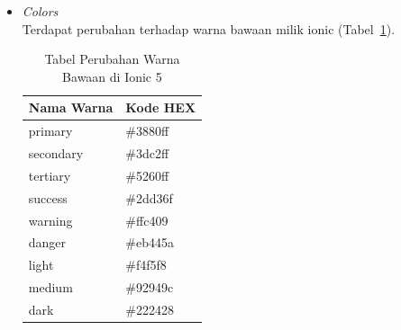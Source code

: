 \begin{enumerate}
\begin{itemize}
\begin{itemize}
			Properti {\it selected} telah dihapus. Sebagai gantinya harus mengatur properti nilai pada ion-select induk agar sesuai dengan opsi terpilih yang diinginkan (Kode~\ref{lst:selectOption}).
			\begin{lstlisting}[language=php, label={lst:selectOption}, caption=Kode Program untuk Select Option]
				<ion-select value="two">
					<ion-select-option value="one">One</ion-select-option>
					<ion-select-option value="two">Two</ion-select-option>
				</ion-select>
			\end{lstlisting}
			\item {\it Toast} \\
			Properti {\it close button} seperti showCloseButton dan closeButtonText telah dihapus. Sebagai gantinya, gunakan {\it buttons array} untuk fungsi batal (Kode~\ref{lst:toast}.
			\begin{lstlisting}[language=php, label={lst:toast}, caption=Kode Program untuk Toast]
				async presentToast() {
					const toast = await this.toastController.create({
						message: 'Your settings have been saved.',
						buttons: [
						{
							text: 'Close',
							role: 'cancel',
							handler: () => {
							console.log('Close clicked');
						}
						}
						]
					});
					toast.present();
				}
			\end{lstlisting}
		\end{itemize}
		Selain yang sudah disebutkan, terdapat beberapa komponen lain yang mendapat perubahan di Ionic 5, namun tidak ditulis di dalam dokumen skripsi ini. Komponen tersebut antara lain Action Sheet, Anchor, Card, FAB, Item, Menu Button, Nav Link, Radio, Segment, Segment Button, Skeleton Text, Split Pane, dan Tabs~\footnote{\textit{`Breaking Changes'} https://github.com/ionic-team/ionic-framework/blob/main/BREAKING.md, Diakses pada 20 November 2021. \label{ref:breakingChangesIonic5}}.

		\item {\it Colors} \\
		Terdapat perubahan terhadap warna bawaan milik ionic (Tabel~\ref{table:colors}).
		\begin{table}[H]
		\centering
			\begin{tabular}{|l|l|}
				\hline
				Nama Warna & Kode HEX \\ \hline
				primary    & \#3880ff \\ \hline
				secondary  & \#3dc2ff \\ \hline
				tertiary   & \#5260ff \\ \hline
				success    & \#2dd36f \\ \hline
				warning    & \#ffc409 \\ \hline
				danger     & \#eb445a \\ \hline
				light      & \#f4f5f8 \\ \hline
				medium     & \#92949c \\ \hline
				dark       & \#222428 \\ \hline
			\end{tabular}
			\caption{Tabel Perubahan Warna Bawaan di Ionic 5}
			\label{table:colors}
		\end{table}
		

\end{itemize}
\end{enumerate}
